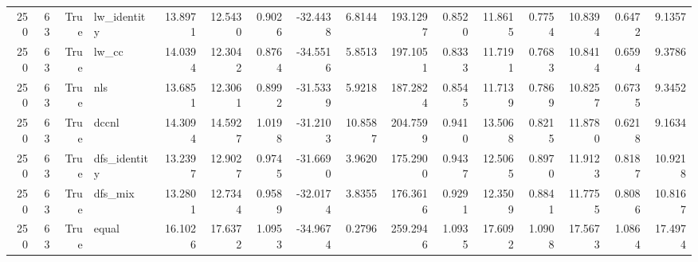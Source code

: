 \begin{tabular}{rrrlrrrrrrrrrrrr}
250 & 63 & True & lw_identity & 13.8971 & 12.5430 & 0.9026 & -32.4438 & 6.8144 & 193.1297 & 0.8520 & 11.8615 & 0.7754 & 10.8394 & 0.6472 & 9.1357 \\
250 & 63 & True & lw_cc & 14.0394 & 12.3042 & 0.8764 & -34.5516 & 5.8513 & 197.1051 & 0.8333 & 11.7191 & 0.7683 & 10.8414 & 0.6594 & 9.3786 \\
250 & 63 & True & nls & 13.6851 & 12.3061 & 0.8992 & -31.5339 & 5.9218 & 187.2824 & 0.8545 & 11.7139 & 0.7869 & 10.8257 & 0.6735 & 9.3452 \\
250 & 63 & True & dccnl & 14.3094 & 14.5927 & 1.0198 & -31.2103 & 10.8587 & 204.7599 & 0.9410 & 13.5068 & 0.8215 & 11.8780 & 0.6218 & 9.1634 \\
250 & 63 & True & dfs_identity & 13.2397 & 12.9027 & 0.9745 & -31.6690 & 3.9620 & 175.2900 & 0.9437 & 12.5065 & 0.8970 & 11.9123 & 0.8187 & 10.9218 \\
250 & 63 & True & dfs_mix & 13.2801 & 12.7344 & 0.9589 & -32.0174 & 3.8355 & 176.3616 & 0.9291 & 12.3509 & 0.8841 & 11.7755 & 0.8086 & 10.8167 \\
250 & 63 & True & equal & 16.1026 & 17.6372 & 1.0953 & -34.9674 & 0.2796 & 259.2946 & 1.0935 & 17.6092 & 1.0908 & 17.5673 & 1.0864 & 17.4974 \\
\bottomrule
\end{tabular}
